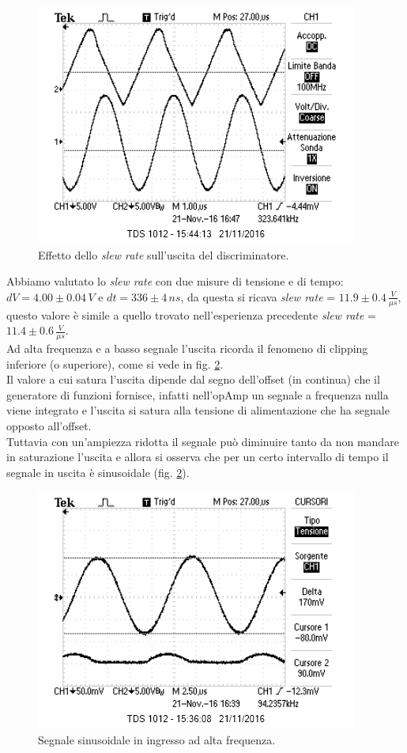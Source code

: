 \documentclass[10pt,a4paper]{article}
\begin{document}
\begin{figure}[htb!]
\centering
\includegraphics[scale=1.0]{immagini/slewRate.png}
\caption{Effetto dello \emph{slew rate} sull'uscita del discriminatore.}
\label{slewRate}
\end{figure}

Abbiamo valutato lo \emph{slew rate} con due misure di tensione e di tempo: $dV = 4.00 \pm 0.04 \, V$ e $dt = 336 \pm 4 \, ns$, da questa si ricava \emph{slew rate} = $11.9 \pm 0.4 \, \frac{V}{\mu s}$, questo valore è simile a quello trovato nell'esperienza precedente \emph{slew rate} = $11.4 \pm 0.6 \, \frac{V}{\mu s}$.\\

Ad alta frequenza e a basso segnale l'uscita ricorda il fenomeno di clipping inferiore (o superiore), come si vede in fig. \ref{clipping}.\\
Il valore a cui satura l'uscita dipende dal segno dell'offset (in continua) che il generatore di funzioni fornisce, infatti nell'opAmp un segnale a frequenza nulla viene integrato e l'uscita si satura alla tensione di alimentazione che ha segnale opposto all'offset.\\
Tuttavia con un'ampiezza ridotta il segnale può diminuire tanto da non mandare in saturazione l'uscita e allora si osserva che per un certo intervallo di tempo il segnale in uscita è sinusoidale (fig. \ref{clipping}).\\

\begin{figure}[htb!]
\centering
\includegraphics[scale=1.0]{immagini/prodottoBandaGuadagno2.png}
\caption{Segnale sinusoidale in ingresso ad alta frequenza.}
\label{clipping}
\end{figure}
\end{document}
